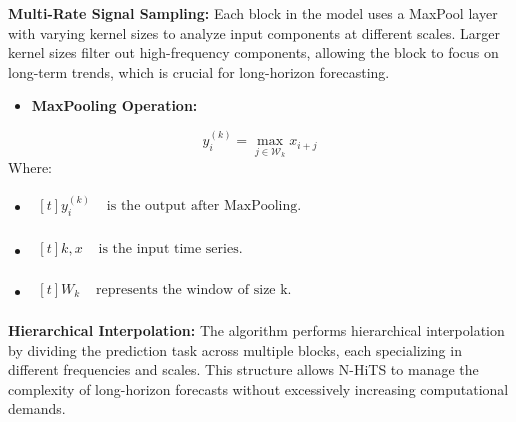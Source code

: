 \documentclass{ieeeojies}
\begin{document}
\textbf{Multi-Rate Signal Sampling:} Each block in the model uses a MaxPool layer with varying kernel sizes to analyze input components at different scales. Larger kernel sizes filter out high-frequency components, allowing the block to focus on long-term trends, which is crucial for long-horizon forecasting.

\begin{itemize}
    \item  \textbf{MaxPooling Operation:} 
\end{itemize}
\begin{equation}
y_i^{(k)} = \max_{j \in \mathcal{W}_k} x_{i+j}
\end{equation}
Where: 
\begin{itemize}
    \item $\begin{aligned}[t]
            y_i^{(k)} & \text{ is the output after MaxPooling.} \\
            \end{aligned}$
    \item $\begin{aligned}[t]
            k, x & \text{ is the input time series.} \\
            \end{aligned}$
    \item $\begin{aligned}[t]
            {W}_k & \text{ represents the window of size k.} \\
            \end{aligned}$
\end{itemize}

\textbf{Hierarchical Interpolation:} The algorithm performs hierarchical interpolation by dividing the prediction task across multiple blocks, each specializing in different frequencies and scales. This structure allows N-HiTS to manage the complexity of long-horizon forecasts without excessively increasing computational demands.
\end{document}

